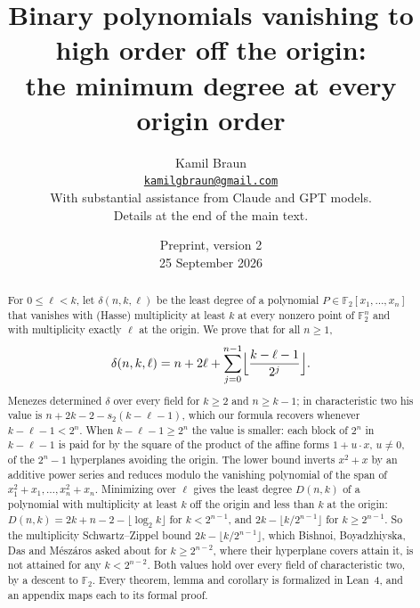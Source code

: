 \documentclass[11pt]{article}
\title{Binary polynomials vanishing to high order off the origin:\\
the minimum degree at every origin order}
\author{Kamil Braun\\
\href{mailto:kamilgbraun@gmail.com}{\texttt{kamilgbraun@gmail.com}}\\[0.6em]
\small With substantial assistance from Claude and GPT models.\\
\small Details at the end of the main text.}
\date{Preprint, version 2\\25 September 2026}
\theoremstyle{definition}
\theoremstyle{remark}
\numberwithin{equation}{section}
\newcommand{\Ft}{\mathbb F_2}
\begin{document}
\maketitle
\begin{abstract}
For \(0\le\ell<k\), let \(\delta(n,k,\ell)\) be the least degree of a polynomial
\(P\in\Ft[x_1,\ldots,x_n]\) that vanishes with (Hasse) multiplicity at least \(k\)
at every nonzero point of \(\Ft^n\) and with multiplicity exactly \(\ell\) at the
origin. We prove that for all \(n\ge1\),
\[
 \delta(n,k,\ell)=n+2\ell+\sum_{j=0}^{n-1}\Bigl\lfloor\frac{k-\ell-1}{2^j}\Bigr\rfloor .
\]
Menezes determined \(\delta\) over every field for \(k\ge2\) and \(n\ge k-1\); in
characteristic two his value is \(n+2k-2-s_2(k-\ell-1)\), which our formula
recovers whenever \(k-\ell-1<2^n\). When \(k-\ell-1\ge2^n\) the value is smaller:
each block of \(2^n\) in \(k-\ell-1\) is paid for by the square of the product of
the affine forms \(1+u\cdot x\), \(u\ne0\), of the \(2^n-1\) hyperplanes avoiding the
origin. The lower bound inverts \(x^2+x\) by an additive power series and reduces
modulo the vanishing polynomial of the span of \(x_1^2+x_1,\ldots,x_n^2+x_n\).
Minimizing over \(\ell\) gives the least degree \(D(n,k)\) of a polynomial with
multiplicity at least \(k\) off the origin and less than \(k\) at the origin:
\(D(n,k)=2k+n-2-\lfloor\log_2k\rfloor\) for \(k<2^{n-1}\), and
\(2k-\lfloor k/2^{n-1}\rfloor\) for \(k\ge2^{n-1}\). So the multiplicity
Schwartz--Zippel bound \(2k-\lfloor k/2^{n-1}\rfloor\), which Bishnoi,
Boyadzhiyska, Das and M\'esz\'aros asked about for \(k\ge2^{n-2}\), where their
hyperplane covers attain it, is not attained for any \(k<2^{n-2}\). Both values hold
over every field of characteristic two, by a descent to \(\Ft\). Every theorem, lemma and corollary is formalized in
Lean~4, and an appendix maps each to its formal proof.
\end{abstract}






\appendix



\end{document}
